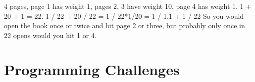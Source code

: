 4 pages, page 1 has weight 1, pages 2, 3 have weight 10, page 4 has weight 1. 
1 + 20 + 1 = 22. 
1 / 22 + 20 / 22 = 1 / 22*1/20  = 1 / 1.1 + 1 / 22
So you would open the book once or twice and hit page 2 or three, but probably only once in 22 opens would you hit 1 or 4.



\section{Programming Challenges}
